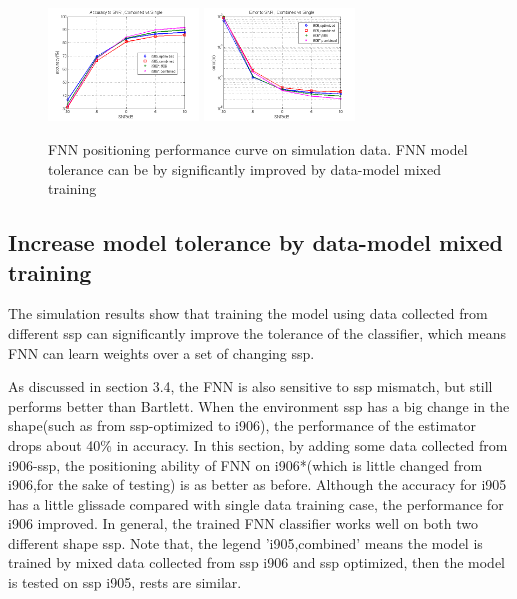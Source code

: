 \begin{figure}
\includegraphics[width=4cm,height=3cm]{figure/Accuracy_to_SNR_Combined_vs_Single}
\includegraphics[width=4cm,height=3cm]{figure/Error_to_SNR_Combined_vs_Single}
\caption{FNN positioning performance curve on simulation data. FNN model tolerance can be by significantly improved by data-model mixed training}
\end{figure}

\subsection{%
Increase model tolerance by data-model mixed training}
The simulation results show that training the model using data collected from different ssp can significantly improve the tolerance of the classifier, which means FNN can learn weights over a set of changing ssp.


As discussed in section 3.4, the FNN is also sensitive to ssp mismatch, but still performs better than Bartlett. When the environment ssp has a big change in the shape(such as from ssp-optimized to i906), the performance of the estimator drops about 40\% in accuracy. In this section, by adding some data collected from i906-ssp, the positioning ability of FNN on i906{*}(which is little changed from i906,for the sake of testing) is as better as before. Although the accuracy for i905 has a little glissade compared with single data training case, the performance for i906 improved. In general, the trained FNN classifier works well on both two different shape ssp. Note that, the legend 'i905,combined' means the model is trained by mixed data collected from ssp i906 and ssp optimized, then the model is tested on ssp i905, rests are similar.

